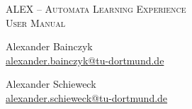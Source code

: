 \begin{titlepage}
	\centering
	\textsc{\LARGE ALEX -- Automata Learning Experience}\\[0.5cm]
	\textsc{\Large User Manual}\\[1.5cm]
	\begin{minipage}{6cm}
		\begin{center} \small
			Alexander Bainczyk \\
			\href{mailto:alexander.bainczyk@tu-dortmund.de}{alexander.bainczyk@tu-dortmund.de}
		\end{center}
	\end{minipage}
	\hfill
	\begin{minipage}{6cm}
		\begin{center} \small
			Alexander Schieweck \\
			\href{mailto:alexander.schieweck@tu-dortmund.de}{alexander.schieweck@tu-dortmund.de}
		\end{center}
	\end{minipage}
\end{titlepage}
